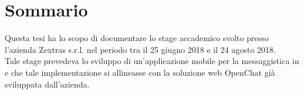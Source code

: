 \cleardoublepage
{}
\section*{Sommario}
Questa tesi ha lo scopo di documentare lo stage accademico svolto presso
 l'azienda Zextras s.r.l. nel periodo tra il 25 giugno 2018 e il 24 agosto 2018.\\ 
 Tale stage prevedeva lo sviluppo di un'applicazione mobile  per la 
 messaggistica in  e che tale implementazione si allineasse con la soluzione web OpenChat già  sviluppata dall'azienda.

\thispagestyle{empty}



\bigskip
